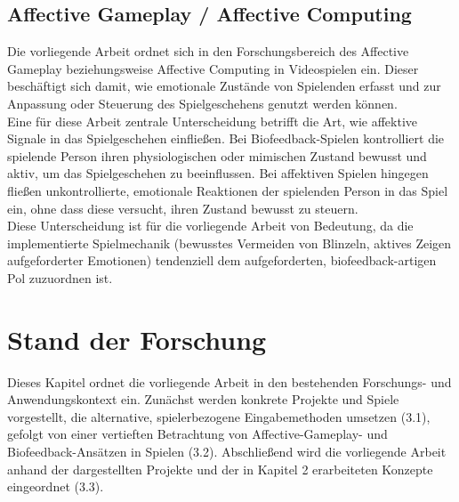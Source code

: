 \documentclass[intern]{cgMA}
\begin{document}
\subsection{Affective Gameplay / Affective Computing}
Die vorliegende Arbeit ordnet sich in den Forschungsbereich des Affective Gameplay beziehungsweise Affective Computing in Videospielen ein. Dieser beschäftigt sich damit, wie emotionale Zustände von Spielenden erfasst und zur Anpassung oder Steuerung des Spielgeschehens genutzt werden können.\\
Eine für diese Arbeit zentrale Unterscheidung betrifft die Art, wie affektive Signale in das Spielgeschehen einfließen. Bei Biofeedback-Spielen kontrolliert die spielende Person ihren physiologischen oder mimischen Zustand bewusst und aktiv, um das Spielgeschehen zu beeinflussen. Bei affektiven Spielen hingegen fließen unkontrollierte, emotionale Reaktionen der spielenden Person in das Spiel ein, ohne dass diese versucht, ihren Zustand bewusst zu steuern.\cite{gilleade2005affective}\cite{Bersak2001IntelligentBU}\\
Diese Unterscheidung ist für die vorliegende Arbeit von Bedeutung, da die implementierte Spielmechanik (bewusstes Vermeiden von Blinzeln, aktives Zeigen aufgeforderter Emotionen) tendenziell dem aufgeforderten, biofeedback-artigen Pol zuzuordnen ist.
\section{Stand der Forschung}
Dieses Kapitel ordnet die vorliegende Arbeit in den bestehenden Forschungs- und Anwendungskontext ein. Zunächst werden konkrete Projekte und Spiele vorgestellt, die alternative, spielerbezogene Eingabemethoden umsetzen (3.1), gefolgt von einer vertieften Betrachtung von Affective-Gameplay- und Biofeedback-Ansätzen in Spielen (3.2). Abschließend wird die vorliegende Arbeit anhand der dargestellten Projekte und der in Kapitel 2 erarbeiteten Konzepte eingeordnet (3.3).
\end{document}
